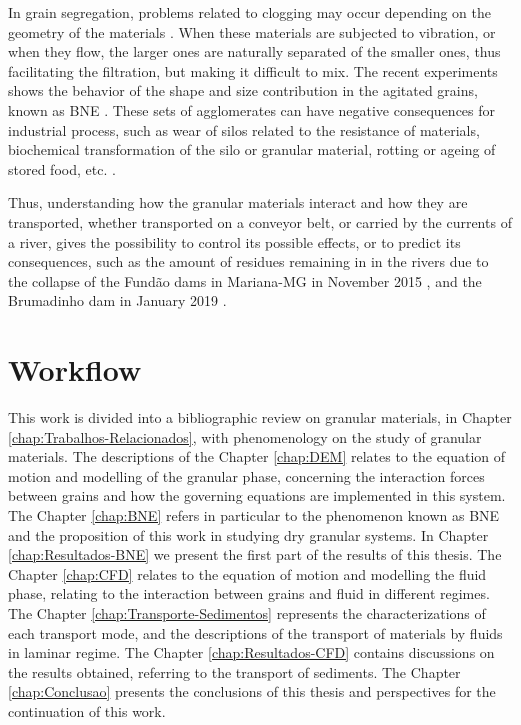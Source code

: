     In grain segregation, problems related to clogging may occur depending on the geometry of the materials \cite{Caio-Tese}. When these materials are subjected to vibration, or when they flow, the larger ones are naturally separated of the smaller ones, thus facilitating the filtration, but making it difficult to mix. The recent experiments shows the behavior of the shape and size contribution in the agitated grains, known as BNE \cite{Size_segregation_of_irregular_granular_materials_captured_by_time-resolved_3D_imaging}. These sets of agglomerates can have negative consequences for industrial process, such as wear of silos related to the resistance of materials, biochemical transformation of the silo or granular material, rotting or ageing of stored food, etc. \cite{Silo_failures}.

    Thus, understanding how the granular materials interact and how they are transported, whether transported on a conveyor belt, or carried by the currents of a river, gives the possibility to control its possible effects, or to predict its consequences, such as the amount of residues remaining in in the rivers due to the collapse of the Fundão dams in Mariana-MG in November 2015 \cite{Mariana_en, Mariana_pt, Mariana_fr}, and the Brumadinho dam in January 2019 \cite{Brumadinho_en, Brumadinho_pt, Brumadinho_fr}.

\section{Workflow}
\label{sec:organizacaoTrabalho}
    This work is divided into a bibliographic review on granular materials, in Chapter \ref{chap:Trabalhos-Relacionados}, with phenomenology on the study of granular materials. The descriptions of the Chapter \ref{chap:DEM} relates to the equation of motion and modelling of the granular phase, concerning the interaction forces between grains and how the governing equations are implemented in this system. The Chapter \ref{chap:BNE} refers in particular to the phenomenon known as BNE and the proposition of this work in studying dry granular systems. In Chapter \ref{chap:Resultados-BNE} we present the first part of the results of this thesis. The Chapter \ref{chap:CFD} relates to the equation of motion and modelling the fluid phase, relating to the interaction between grains and fluid in different regimes. The Chapter \ref{chap:Transporte-Sedimentos} represents the characterizations of each transport mode, and the descriptions of the transport of materials by fluids in laminar regime. The Chapter \ref{chap:Resultados-CFD} contains discussions on the results obtained, referring to the transport of sediments. The Chapter \ref{chap:Conclusao} presents the conclusions of this thesis and perspectives for the continuation of this work.
